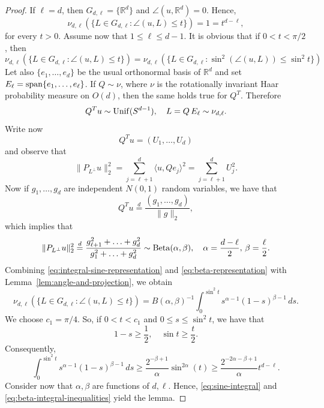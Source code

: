 \documentclass[10pt]{amsart}
\newcommand{\1}{\textbf{1}}
\numberwithin{equation}{section} %
\theoremstyle{remark}
\theoremstyle{definition}
\begin{document}
\begin{proof}
    If $\ell=d$, then $G_{d,\ell}=\{\mathbb{R}^d\}$ and $\angle(u,\mathbb{R}^d)=0$. Hence, \[\nu_{d,\ell}(\{L \in G_{d,\ell}: \angle (u,L) \leq t\})=1=t^{d-\ell},
    \] for every $t>0$. Assume now that $1 \leq \ell \leq d-1$. It is obvious  that if $0<t<\pi/2$, then \begin{equation}\label{eq:integral-sine-representation}
        \nu_{d,\ell}(\{L \in G_{d,\ell}: \angle (u,L) \leq t\})=\nu_{d,\ell}(\{L \in G_{d,\ell}: \sin^2(\angle(u,L)) \leq \sin^2t\})
    \end{equation} Let also $\{e_1,\ldots,e_d\}$ be the usual orthonormal basis of $\mathbb{R}^d$ and set $E_\ell={\rm span}\{e_1,\ldots,e_\ell\}$. If $Q \sim \nu$, where $\nu$ is the rotationally invariant Haar probability measure on $O(d)$, then the same holds true for $Q^T$. Therefore \[Q^Tu \sim {\rm Unif}(S^{d-1}), \quad L=Q\,E_\ell\sim\nu_{d,\ell}.\] Write now \[Q^Tu=(U_1,\ldots,U_d)\] and observe that \[\|P_{L^\perp}u\|_2^2 =\sum_{j=\ell+1}^d \langle u,Qe_j \rangle^2=\sum_{j=\ell+1}^{d} U_j^2.\] Now if $g_1,\ldots,g_d$ are independent $N(0,1)$ random variables, we have that \[Q^Tu\overset{d}{=} \frac{(g_1,\ldots,g_d)}{\|g\|_2}, \] which implies that \begin{equation}\label{eq:beta-representation}
        \|P_{L^\perp}u\|_2^2 \overset{d}{=}\frac{g_{\ell+1}^2+\ldots+g_d^2}{g_1^2+\ldots+g_d^2} \sim {\rm Beta}(\alpha,\beta), \quad \alpha=\frac{d-\ell}{2}, \, \beta=\frac{\ell}{2}.
    \end{equation} Combining \eqref{eq:integral-sine-representation} and \eqref{eq:beta-representation} with Lemma~\ref{lem:angle-and-projection}, we obtain 
    \begin{equation}\label{eq:sine-integral}
       \nu_{d,\ell}(\{L \in G_{d,\ell}: \angle (u,L) \leq t\})=B(\alpha,\beta)^{-1} \int_{0}^{\sin^2 t} s^{\alpha-1}(1-s)^{\beta-1} \, ds.
    \end{equation}
    We choose $c_1=\pi/4$. So, if $0<t<c_1$ and $0 \leq s \leq \sin^2 t$, we have that  \[1-s \geq \frac{1}{2}, \quad \sin t \geq \frac{t}{2}.\] Consequently, \begin{equation}\label{eq:beta-integral-inequalities}
        \int_{0}^{\sin^2 t} s^{\alpha-1}(1-s)^{\beta-1} \, ds \geq \frac{2^{-\beta+1}}{\alpha} \sin^{2\alpha}(t)\geq \frac{2^{-2\alpha-\beta+1}}{\alpha} t^{d-\ell}.    
    \end{equation} Consider now that $\alpha,\beta$ are functions of $d, \ell$. Hence, \eqref{eq:sine-integral} and \eqref{eq:beta-integral-inequalities} yield the lemma.
\end{proof}
\end{document}
